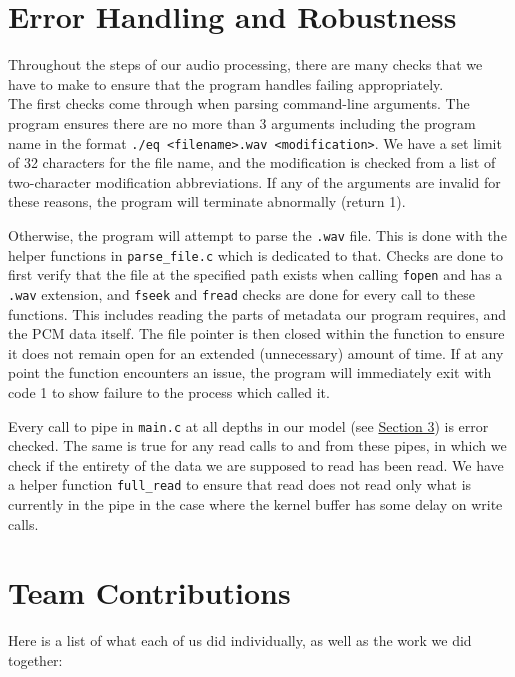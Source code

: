 \documentclass{article}
\begin{document}
\section{Error Handling and Robustness}\label{err}

Throughout the steps of our audio processing, there are many checks that we have to make to ensure that the program handles failing appropriately.\\

The first checks come through when parsing command-line arguments. The program ensures there are no more than 3 arguments including the program name in the format \texttt{./eq <filename>.wav <modification>}. We have a set limit of 32 characters for the file name, and the modification is checked from a list of two-character modification abbreviations. If any of the arguments are invalid for these reasons, the program will terminate abnormally (return 1).

Otherwise, the program will attempt to parse the \texttt{.wav} file. This is done with the helper functions in \texttt{parse\_file.c} which is dedicated to that. Checks are done to first verify that the file at the specified path exists when calling \texttt{fopen} and has a \texttt{.wav} extension, and \texttt{fseek} and \texttt{fread} checks are done for every call to these functions. This includes reading the parts of metadata our program requires, and the PCM data itself. The file pointer is then closed within the function to ensure it does not remain open for an extended (unnecessary) amount of time. If at any point the function encounters an issue, the program will immediately exit with code 1 to show failure to the process which called it.

Every call to pipe in \texttt{main.c} at all depths in our model (see \hyperref[arch]{Section 3}) is error checked. The same is true for any read calls to and from these pipes, in which we check if the entirety of the data we are supposed to read has been read. We have a helper function \texttt{full\_read} to ensure that read does not read only what is currently in the pipe in the case where the kernel buffer has some delay on write calls. 

\section{Team Contributions}\label{team}

Here is a list of what each of us did individually, as well as the work we did together:\\
\end{document}

